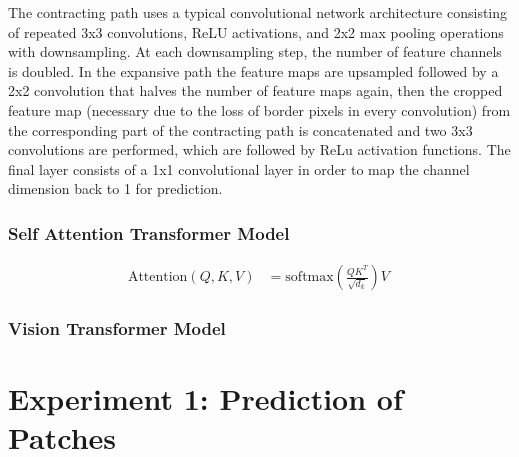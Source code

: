 \documentclass[12pt]{article}
\begin{document}
The contracting path uses a typical convolutional network architecture consisting of repeated 3x3 convolutions, ReLU activations, and 2x2 max pooling operations with downsampling. At each downsampling step, the number of feature channels is doubled. In the expansive path the feature maps are upsampled followed by a 2x2 convolution that halves the number of feature maps again, then the cropped feature map (necessary due to the loss of border pixels in every convolution) from the corresponding part of the contracting path is concatenated and two 3x3 convolutions are performed, which are followed by ReLu activation functions. The final layer consists of a 1x1 convolutional layer in order to map the channel dimension back to 1 for prediction. 

\subsubsection{Self Attention Transformer Model}
\begin{equation}
\begin{aligned}
	\text{Attention}(Q, K, V) &= \text{softmax}\left(\frac{QK^T}{\sqrt{d_k}}\right)V \
\end{aligned}
\end{equation}

\citet{vaswani2017attention}

\subsubsection{Vision Transformer Model}




\section{Experiment 1: Prediction of Patches}
\end{document}
